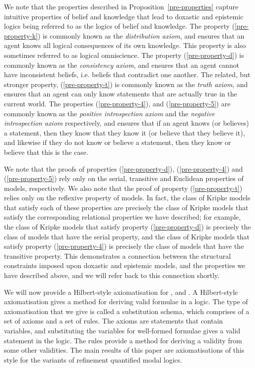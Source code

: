 We note that the properties described in Proposition~\ref{pre-properties}
capture intuitive properties of belief and knowledge that lead to doxastic and
epistemic logics being referred to as the logics of belief and knowledge. The
property (\ref{pre-property-k}) is commonly known as the {\em distribution
axiom}, and ensures that an agent knows all logical consequences of its own
knowledge.  This property is also sometimes referred to as logical omniscience.
The property (\ref{pre-property-d}) is commonly known as the {\em consistency
axiom}, and ensures that an agent cannot have inconsistent beliefs, i.e. beliefs
that contradict one another.  The related, but stronger property,
(\ref{pre-property-t}) is commonly known as the {\em truth axiom}, and ensures
that an agent can only know statements that are actually true in the current
world. The properties (\ref{pre-property-4}), and (\ref{pre-property-5}) are
commonly known as the {\em positive introspection axiom} and the {\em negative
introspection axiom} respectively, and ensures that if an agent knows (or
believes) a statement, then they know that they know it (or believe that they
believe it), and likewise if they do not know or believe a statement, then they
know or believe that this is the case.

We note that the proofs of properties (\ref{pre-property-d}),
(\ref{pre-property-4}) and (\ref{pre-property-5}) rely only on the serial,
transitive and Euclidean properties of \classKD{} models, respectively. We also
note that the proof of property (\ref{pre-property-t}) relies only on the
reflexive property of \classS{} models. In fact, the class of Kripke models that
satisfy each of these properties are precisely the class of Kripke models that
satisfy the corresponding relational properties we have described; for example,
the class of Kripke models that satisfy property (\ref{pre-property-d}) is
precisely the class of models that have the serial property, and the class of
Kripke models that satisfy property (\ref{pre-property-4}) is precisely the
class of models that have the transitive property. This demonstrates a
connection between the structural constraints imposed upon doxastic and
epistemic models, and the properties we have described above, and we will refer
back to this connection shortly.

We will now provide a Hilbert-style axiomatisation for \logicK{}, \logicKD{} and
\logicS{}. A Hilbert-style axiomatisation gives a method for deriving valid
formulae in a logic. The type of axiomatisation that we give is called a
substitution schema, which comprises of a set of axioms and a set of rules. The
axioms are statements that contain variables, and substituting the variables for
well-formed formulae gives a valid statement in the logic. The rules provide a
method for deriving a validity from some other validities. The main results of
this paper are axiomatisations of this style for the variants of refinement
quantified modal logics.
 
